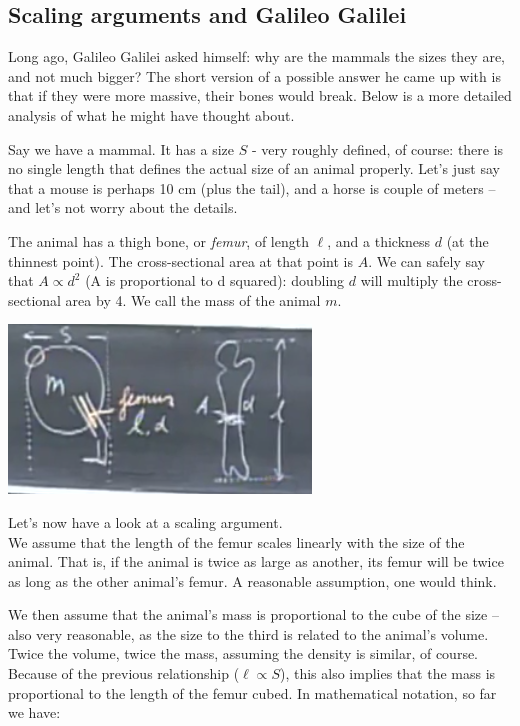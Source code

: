 \documentclass[12pt,a4paper]{report}
\begin{document}
\subsection{Scaling arguments and Galileo Galilei}

Long ago, Galileo Galilei asked himself: why are the mammals the sizes they are, and not much bigger? The short version of a possible answer he came up with is that if they were more massive, their bones would break. Below is a more detailed analysis of what he might have thought about.

Say we have a mammal. It has a size $S$ - very roughly defined, of course: there is no single length that defines the actual size of an animal properly. Let's just say that a mouse is perhaps 10 cm (plus the tail), and a horse is couple of meters -- and let's not worry about the details.

The animal has a thigh bone, or \emph{femur}, of length $\ell$, and a thickness $d$ (at the thinnest point). The cross-sectional area at that point is $A$. We can safely say that $A \propto d^2$ (A is proportional to d squared): doubling $d$ will multiply the cross-sectional area by 4.
We call the mass of the animal $m$.

\begin{center}
\includegraphics{Graphics/femur}
\end{center}

Let's now have a look at a scaling argument.\\
We assume that the length of the femur scales linearly with the size of the animal. That is, if the animal is twice as large as another, its femur will be twice as long as the other animal's femur. A reasonable assumption, one would think.

We then assume that the animal's mass is proportional to the cube of the size -- also very reasonable, as the size to the third is related to the animal's volume. Twice the volume, twice the mass, assuming the density is similar, of course.\\
Because of the previous relationship ($\ell \propto S$), this also implies that the mass is proportional to the length of the femur cubed. In mathematical notation, so far we have:
\end{document}
